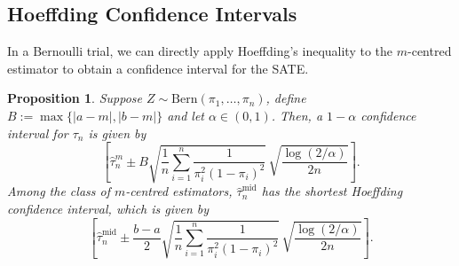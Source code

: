 \documentclass[aos]{imsart2}
\theoremstyle{plain}
\newtheorem{proposition}[theorem]{Proposition}
\theoremstyle{definition}
\newcommand{\R}{\mathbb{R}}
\newcommand{\tauh}{\hat{\tau}}
\newcommand{\tauhm}{\hat{\tau}^{\mathrm{mid}}}
\newcommand{\bern}{\mathrm{Bern}}
\begin{document}
\subsection{Hoeffding Confidence Intervals}
In a Bernoulli trial, we can directly apply Hoeffding's inequality to the $m$-centred estimator to obtain a confidence interval for the SATE.

\begin{proposition}\label{prop:bernoulli-hoeffding}
    Suppose $Z\sim \bern(\pi_1,\ldots,\pi_n)$, define $B:=\max\{\lvert a-m\rvert, \lvert b- m \rvert\}$ and let $\alpha \in (0,1)$. Then, a $1-\alpha$ confidence interval for $\tau_n$ is given by
    \begin{equation*}
        \left[\tauh_n^m \pm B \sqrt{\frac{1}{n}\sum_{i=1}^n\frac{1}{\pi_i^2(1-\pi_i)^2}}\, \sqrt{\frac{\log(2/\alpha)}{2n}}\right].
    \end{equation*}
    Among the class of $m$-centred estimators, $\tauhm_n$ has the shortest Hoeffding confidence interval, which is given by
    \begin{equation*}
        \left[\tauhm_n \pm \frac{b-a}{2} \sqrt{\frac{1}{n}\sum_{i=1}^n\frac{1}{\pi_i^2(1-\pi_i)^2}}\, \sqrt{\frac{\log(2/\alpha)}{2n}}\right].
    \end{equation*}
\end{proposition}
\end{document}
